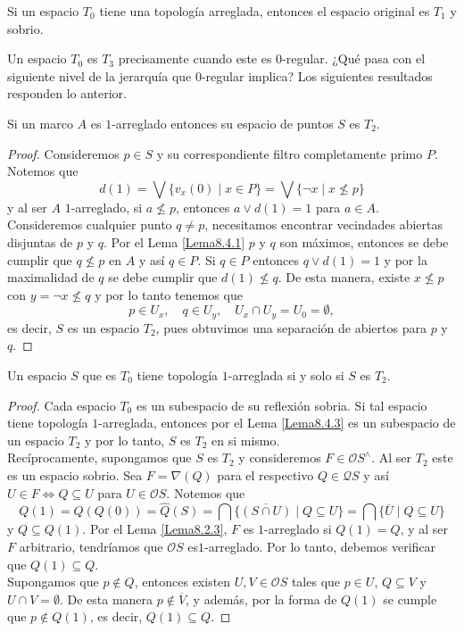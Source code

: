 \begin{lem}\label{Lema8.4.2}
    Si un espacio $T_0$ tiene una topología arreglada, entonces el espacio original es $T_1$ y sobrio.
\end{lem}

Un espacio $T_0$ es $T_3$ precisamente cuando este es $0$-regular. ¿Qué pasa con el siguiente nivel de la jerarquía que $0$-regular implica? Los siguientes resultados responden lo anterior. 

\begin{lem}\label{Lema8.4.3}
    Si un marco $A$ es $1$-arreglado entonces su espacio de puntos $S$ es $T_2$.
\end{lem}

\begin{proof}
    Consideremos $p\in S$ y su correspondiente filtro completamente primo $P$. Notemos que 
    \[
    d(1)=\bigvee\{v_x(0)\mid x\in P\}=\bigvee\{\neg x\mid x\nleq p\}
    \]
    y al ser $A$ $1$-arreglado, si $a\nleq p$, entonces $a\vee d(1)=1$ para $a\in A$. Consideremos cualquier punto $q\neq p$, necesitamos encontrar vecindades abiertas disjuntas de $p$ y $q$. Por el Lema \ref{Lema8.4.1} $p$ y $q$ son máximos, entonces se debe cumplir que $q\nleq p$ en $A$ y así $q\in P$. Si $q\in P$ entonces $q\vee d(1)=1$ y por la maximalidad de $q$ se debe cumplir que $d(1)\nleq q$. De esta manera, existe $x\nleq p$ con $y=\neg x\nleq q$ y por lo tanto tenemos que 
    \[
    p\in U_x,\quad q\in U_y,\quad U_x\cap U_y=U_0=\emptyset,
    \]
    es decir, $S$ es un espacio $T_2$, pues obtuvimos una separación de abiertos para $p$ y $q$.
\end{proof}

\begin{thm}\label{Teorema8.4.4}
    Un espacio $S$ que es $T_0$ tiene topología $1$-arreglada si y solo si $S$ es $T_2$.
\end{thm}

\begin{proof}
    Cada espacio $T_0$ es un subespacio de su reflexión sobria. Si tal espacio tiene topología $1$-arreglada, entonces por el Lema \ref{Lema8.4.3} es un subespacio de un espacio $T_2$ y por lo tanto, $S$ es $T_2$ en si mismo.\\

    Recíprocamente, supongamos que $S$ es $T_2$ y consideremos $F\in \mathcal{O}S^\wedge$. Al ser $T_2$ este es un espacio sobrio. Sea $F=\nabla(Q)$ para el respectivo $Q\in \mathcal{Q}S$ y así $U\in F\Leftrightarrow Q\subseteq U$ para $U\in \mathcal{O}S$. Notemos que 
    \[
    Q(1)=\hat{Q}(Q(0))=\hat{Q}(S)=\bigcap\{\overline{(S\cap U)}\mid Q\subseteq U\}=\bigcap\{\overline{U}\mid Q\subseteq U\}
    \]
    y $Q\subseteq Q(1)$. Por el Lema \ref{Lema8.2.3},  $F$ es $1$-arreglado si $Q(1)=Q$, y al ser $F$ arbitrario, tendríamos que $\mathcal{O}S$ es$1$-arreglado. Por lo tanto, debemos verificar que $Q(1)\subseteq Q$.\\

    Supongamos que $p\notin Q$, entonces existen $U, V\in \mathcal{O}S$ tales que $p\in U$, $Q\subseteq V$ y $U\cap V=\emptyset$. De esta manera $p\notin \overline{V}$, y además, por la forma de $Q(1)$ se cumple que $p\notin Q(1)$, es decir, $Q(1)\subseteq Q$.
\end{proof}

